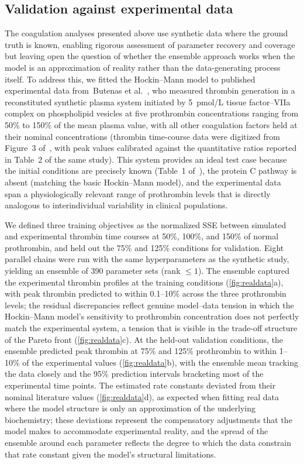 \documentclass[preprint,review,12pt]{elsarticle}
\begin{document}
\subsection{Validation against experimental data}\label{sec:realdata}
The coagulation analyses presented above use synthetic data where the ground truth is known, enabling rigorous assessment of parameter recovery and coverage but leaving open the question of whether the ensemble approach works when the model is an approximation of reality rather than the data-generating process itself.
To address this, we fitted the Hockin--Mann model to published experimental data from~Butenas et al.~\cite{Butenas1999}, who measured thrombin generation in a reconstituted synthetic plasma system initiated by 5~pmol/L tissue factor--VIIa complex on phospholipid vesicles at five prothrombin concentrations ranging from 50\% to 150\% of the mean plasma value, with all other coagulation factors held at their nominal concentrations (thrombin time-course data were digitized from Figure~3 of~\cite{Butenas1999}, with peak values calibrated against the quantitative ratios reported in Table~2 of the same study).
This system provides an ideal test case because the initial conditions are precisely known (Table~1 of~\cite{Butenas1999}), the protein C pathway is absent (matching the basic Hockin--Mann model), and the experimental data span a physiologically relevant range of prothrombin levels that is directly analogous to interindividual variability in clinical populations.

We defined three training objectives as the normalized SSE between simulated and experimental thrombin time courses at 50\%, 100\%, and 150\% of normal prothrombin, and held out the 75\% and 125\% conditions for validation.
Eight parallel chains were run with the same hyperparameters as the synthetic study, yielding an ensemble of 390 parameter sets (rank $\leq 1$).
The ensemble captured the experimental thrombin profiles at the training conditions (\cref{fig:realdata}a), with peak thrombin predicted to within 0.1--10\% across the three prothrombin levels; the residual discrepancies reflect genuine model--data tension in which the Hockin--Mann model's sensitivity to prothrombin concentration does not perfectly match the experimental system, a tension that is visible in the trade-off structure of the Pareto front (\cref{fig:realdata}c).
At the held-out validation conditions, the ensemble predicted peak thrombin at 75\% and 125\% prothrombin to within 1--10\% of the experimental values (\cref{fig:realdata}b), with the ensemble mean tracking the data closely and the 95\% prediction intervals bracketing most of the experimental time points.
The estimated rate constants deviated from their nominal literature values (\cref{fig:realdata}d), as expected when fitting real data where the model structure is only an approximation of the underlying biochemistry; these deviations represent the compensatory adjustments that the model makes to accommodate experimental reality, and the spread of the ensemble around each parameter reflects the degree to which the data constrain that rate constant given the model's structural limitations.
\end{document}

